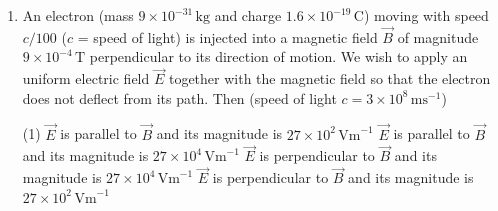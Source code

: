 \begin{enumerate}[leftmargin=*]
\item[$\Omega.$] An electron (mass $9 \times 10^{-31}\,\mathrm{kg}$ and charge $1.6 \times 10^{-19}\,\mathrm{C}$) moving with speed $c/100$ ($c$ = speed of light) is injected into a magnetic field $\vec{B}$ of magnitude $9 \times 10^{-4}\,\mathrm{T}$ perpendicular to its direction of motion. We wish to apply an uniform electric field $\vec{E}$ together with the magnetic field so that the electron does not deflect from its path. Then (speed of light $c = 3 \times 10^8\,\mathrm{m s}^{-1}$)
\begin{tasks}(1)
    \task $\vec{E}$ is parallel to $\vec{B}$ and its magnitude is $27 \times 10^2\,\mathrm{V m}^{-1}$
    \task $\vec{E}$ is parallel to $\vec{B}$ and its magnitude is $27 \times 10^4\,\mathrm{V m}^{-1}$
    \task $\vec{E}$ is perpendicular to $\vec{B}$ and its magnitude is $27 \times 10^4\,\mathrm{V m}^{-1}$
    \task $\vec{E}$ is perpendicular to $\vec{B}$ and its magnitude is $27 \times 10^2\,\mathrm{V m}^{-1}$ 
\end{tasks}
\end{enumerate}
